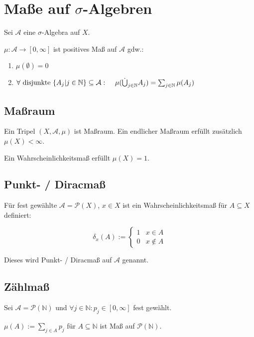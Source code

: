 \section*{Maße auf $\sigma$-Algebren}

Sei $\mathcal{A}$ eine $\sigma$-Algebra auf $X$.

$\mu : \mathcal{A} \rightarrow [0, \infty]$ ist positives Maß auf $\mathcal{A}$ gdw.:

\begin{enumerate}[label=(\alph*)]
	\item $\mu(\emptyset) = 0$
	\item $\forall \text{ disjunkte } \{A_j | j \in \mathbb{N}\} \subseteq \mathcal{A} :\\ \hspace*{4mm} \mu(\dot\bigcup_{j\in \mathbb{N}} A_j) = \sum_{j\in \mathbb{N}} \mu(A_j)$
\end{enumerate}

\subsection*{Maßraum}

Ein Tripel $(X, \mathcal{A}, \mu)$ ist Maßraum. Ein endlicher Maßraum erfüllt zusätzlich $\mu(X) < \infty$.

Ein Wahrscheinlichkeitsmaß erfüllt $\mu(X) = 1$.

\subsection*{Punkt- / Diracmaß}

Für fest gewählte $\mathcal{A} = \mathcal{P}(X)$, $x \in X$ ist ein Wahrscheinlichkeitsmaß für $A \subseteq X$ definiert:

$$\delta_x(A) := \begin{cases}
	1 & x \in A \\
	0 & x \notin A
\end{cases}$$

Dieses wird Punkt- / Diracmaß auf $\mathcal{A}$ genannt.

\subsection*{Zählmaß}

Sei $\mathcal{A} = \mathcal{P}(\mathbb{N})$ und $\forall j \in \mathbb{N} : p_j \in [0, \infty]$ fest gewählt.

$\mu(A) := \sum_{j\in A} p_j$ für $A \subseteq \mathbb{N}$ ist Maß auf $\mathcal{P}(\mathbb{N})$.

